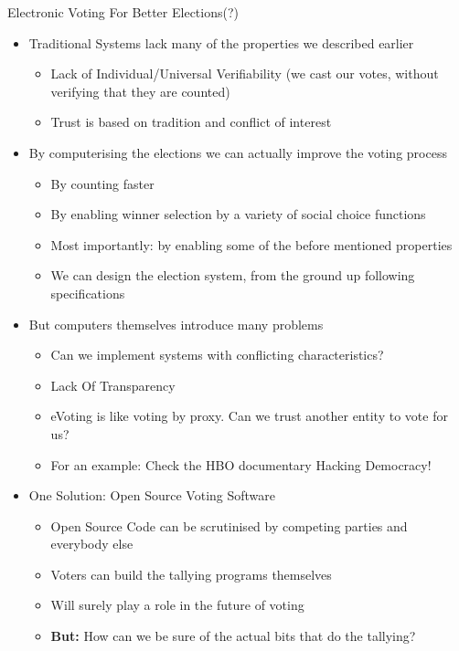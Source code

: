 \documentclass{beamer}
\begin{document}
\begin{frame}[allowframebreaks]{Electronic Voting For Better Elections(?)}
\begin{itemize}

\item Traditional Systems lack many of the properties we described earlier
\begin{itemize}
\item Lack of Individual/Universal Verifiability (we cast our votes, without verifying that they are counted)
\item Trust is based on tradition and conflict of interest
\end{itemize}

\item By computerising the elections we can actually improve the voting process
\begin{itemize}
\item By counting faster
\item By enabling winner selection by a variety of social choice functions
\item Most importantly: by enabling some of the before mentioned properties
\item We can design the election system, from the ground up following specifications
\end{itemize}

\item But computers themselves introduce many problems 
\begin{itemize}
\item Can we implement systems with conflicting characteristics?
\item Lack Of Transparency
\item eVoting is like voting by proxy. Can we trust another entity to vote for us?
\item For an example: Check the HBO  documentary Hacking Democracy!
\end{itemize}

\framebreak

\item One Solution: Open Source Voting Software
\begin{itemize}
\item Open Source Code can be scrutinised by competing parties and everybody else
\item Voters can build the tallying programs themselves
\item Will surely play a role in the future of voting
\item \textbf{But:} How can we be sure of the actual bits that do the tallying?
\end{itemize}


\end{itemize}
\end{frame}
\end{document}
